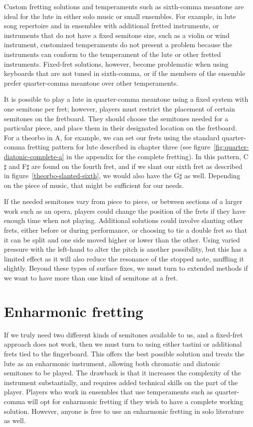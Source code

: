Custom fretting solutions and temperaments such as sixth-comma meantone are ideal
for the lute in either solo music or small ensembles.  For example, in lute song
repertoire and in ensembles with additional fretted instruments, or instruments that do not
have a fixed semitone size, such as a violin or wind instrument, customized temperaments
do not present a problem because the instruments can conform to the temperament of
the lute or other fretted instruments. Fixed-fret solutions, however, become
problematic when using keyboards that are not tuned in sixth-comma, or if the members
of the ensemble prefer quarter-comma meantone over other temperaments.

It is possible to play a lute in quarter-comma meantone using a fixed system with one semitone per
fret; however, players must restrict the placement of certain semitones
on the fretboard.  They should choose the semitones needed for a particular
piece, and place them in their designated location on the fretboard.  For a theorbo
in A, for example, we can set our frets using the standard quarter-comma fretting
pattern for lute described in chapter three (see figure~\ref{fig:quarter-diatonic-complete-a}
in the appendix for the complete fretting).  In this pattern, C$\sharp$ and F$\sharp$
are found on the fourth fret, and if we slant our sixth fret as described in
figure~\ref{theorbo-slanted-sixth}, we would also have the G$\sharp$ as well. Depending
on the piece of music, that might be sufficient for our needs.

If the needed semitones vary from piece to piece, or between sections of a larger work
such as an opera, players could change the position of the frets if they have enough
time when not playing. Additional solutions could involve slanting
other frets, either before or during performance, or choosing to tie a double fret so
that it can be split and one side moved higher or lower than the other. Using varied
pressure with the left-hand to alter the pitch is another possibility, but this
has a limited effect as it will also reduce the resonance of the stopped note, muffling
it slightly. Beyond these types of surface fixes, we must turn to extended methods if
we want to have more than one kind of semitone at a fret.

\section{Enharmonic fretting}

If we truly need two different kinds of semitones available to us, and a fixed-fret
approach does not work, then we must turn to using either tastini or additional frets
tied to the fingerboard.  This offers the best possible solution and treats the lute as
an enharmonic instrument, allowing both chromatic and diatonic semitones to be
played. The drawback is that it increases the complexity of the instrument substantially,
and requires added technical skills on the part of the player. Players who work in
ensembles that use temperaments such as quarter-comma will opt for enharmonic fretting
if they wish to have a complete working solution. However, anyone is free to use an
enharmonic fretting in solo literature as well.

